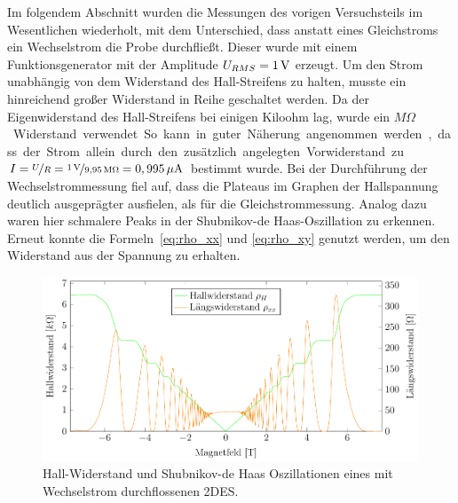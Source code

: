
Im folgendem Abschnitt wurden die Messungen des vorigen Versuchsteils im Wesentlichen wiederholt, mit dem Unterschied, dass anstatt eines Gleichstroms ein Wechselstrom die Probe durchfließt. 
Dieser wurde mit einem Funktionsgenerator mit der Amplitude $U_{RMS}=\unit[1]{V}$ erzeugt. Um den Strom unabhängig von dem Widerstand des Hall-Streifens zu halten, musste ein hinreichend großer Widerstand in Reihe geschaltet werden. Da der Eigenwiderstand des Hall-Streifens bei einigen Kiloohm lag, wurde ein \unit[9,95]{$M\Omega$} Widerstand verwendet. So kann in guter Näherung angenommen werden, dass der Strom allein durch den zusätzlich angelegten Vorwiderstand zu $I=\nicefrac{U}{R}=\nicefrac{\unit[1]{V}}{\unit[9,95]{M\Omega}}=\unit[0,995]{\mu A}$ bestimmt wurde. 
Bei der Durchführung der Wechselstrommessung fiel auf, dass die Plateaus im Graphen der Hallspannung %
deutlich ausgeprägter ausfielen, als für die Gleichstrommessung. Analog dazu waren hier schmalere Peaks in der Shubnikov-de Haas-Oszillation zu erkennen.  
Erneut konnte die Formeln~\eqref{eq:rho_xx} und \eqref{eq:rho_xy} genutzt werden, um den Widerstand aus der Spannung zu erhalten.

\begin{figure}[h]
	\centering
	\includegraphics{graphs/ac/full_range.pdf}
	\caption[Wechselstrommessung im maximalen Magnetfeldbereich]{
		Hall-Widerstand und Shubnikov-de Haas Oszillationen eines mit Wechselstrom durchflossenen 2DES.
	}
	\label{fig:full_range_ac}
\end{figure}


